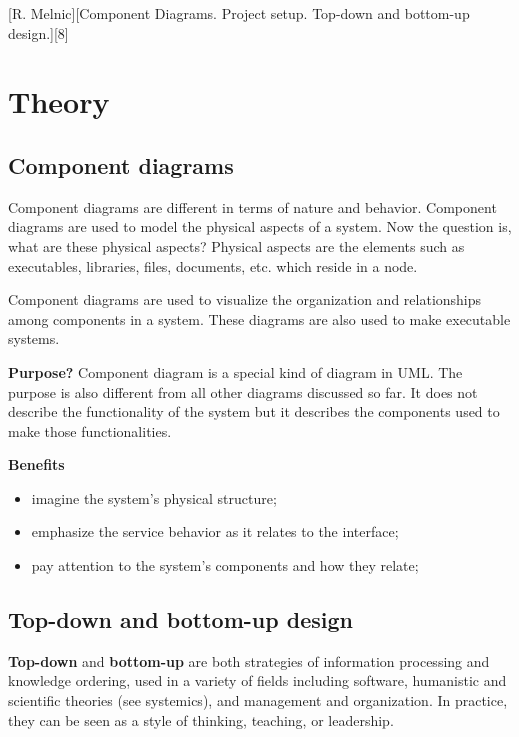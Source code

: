 \documentclass{article}
\begin{document}
	[R. Melnic][Component Diagrams. Project setup. Top-down and bottom-up design.][8]

	\section{Theory}
		\subsection{Component diagrams}
			Component diagrams are different in terms of nature and behavior. Component diagrams are used to model the physical aspects of a system. Now the question is, what are these physical aspects? Physical aspects are the elements such as executables, libraries, files, documents, etc. which reside in a node.

			Component diagrams are used to visualize the organization and relationships among components in a system. These diagrams are also used to make executable systems.

			\textbf{Purpose?} Component diagram is a special kind of diagram in UML. The purpose is also different from all other diagrams discussed so far. It does not describe the functionality of the system but it describes the components used to make those functionalities.

			\textbf{Benefits}
			\begin{itemize}
				\item imagine the system’s physical structure;
				
				\item emphasize the service behavior as it relates to the interface;
				
				\item pay attention to the system’s components and how they relate;
			\end{itemize}

		\subsection{Top-down and bottom-up design}
			\textbf{Top-down} and \textbf{bottom-up} are both strategies of information processing and knowledge ordering, used in a variety of fields including software, humanistic and scientific theories (see systemics), and management and organization. In practice, they can be seen as a style of thinking, teaching, or leadership.
\end{document}
